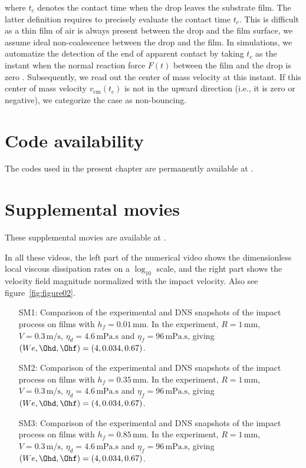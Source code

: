 \begin{subappendices}
	\noindent where $t_c$ denotes the contact time when the drop leaves the substrate film. The latter definition requires to precisely evaluate the contact time $t_c$.
	This is difficult as a thin film of air is always present between the drop and the film surface, we assume ideal non-coalescence between the drop and the film.
	In simulations, we automatize the detection of the end of apparent contact by taking $t_c$ as the instant when the normal reaction force $F(t)$ between the film and the drop is zero \citep[for details on the force calculation, see chapter~\ref{chap:DropForces} and][]{zhang2022impact}. Subsequently, we read out the center of mass velocity at this instant. If this center of mass velocity $v_{\text{cm}}(t_c)$ is not in the upward direction (i.e., it is zero or negative), we categorize the case as non-bouncing. 
	
	\section{Code availability}
	The codes used in the present chapter are permanently available at \citet{basiliskVatsalDropFilm}.
	
	\section{Supplemental movies}
	These supplemental movies are available at \citet[\href{https://youtube.com/playlist?list=PLf5C5HCrvhLHJXLqwpylEwYc2rVtTsCUX}{external YouTube link,}][]{vatsalDropFilmsuppl}. 
	
	In all these videos, the left part of the numerical video shows the dimensionless local viscous dissipation rates on a $\log_{10}$ scale, and the right part shows the velocity field magnitude normalized with the impact velocity. Also see figure~\ref{fig:figure02}.
	
	\begin{enumerate}
		\item[SM1:] Comparison of the experimental and DNS snapshots of the impact process on films with $h_f = 0.01\,\si{\milli\meter}$. In the experiment, $R = 1\,\si{\milli\meter}$, $V = 0.3\,\si{\meter}/\si{\second}$, $\eta_{d} = 4.6\,\si{\milli\pascal}.\si{\second}$ and $\eta_{f} = 96\,\si{\milli\pascal}.\si{\second}$, giving $(We, \Ohd, \Ohf) = (4, 0.034, 0.67)$. 
		\item[SM2:] Comparison of the experimental and DNS snapshots of the impact process on films with $h_f = 0.35\,\si{\milli\meter}$. In the experiment, $R = 1\,\si{\milli\meter}$, $V = 0.3\,\si{\meter}/\si{\second}$, $\eta_{d} = 4.6\,\si{\milli\pascal}.\si{\second}$ and $\eta_{f} = 96\,\si{\milli\pascal}.\si{\second}$, giving $(We, \Ohd, \Ohf) = (4, 0.034, 0.67)$. 
		\item[SM3:]  Comparison of the experimental and DNS snapshots of the impact process on films with $h_f = 0.85\,\si{\milli\meter}$. In the experiment, $R = 1\,\si{\milli\meter}$, $V = 0.3\,\si{\meter}/\si{\second}$, $\eta_{d} = 4.6\,\si{\milli\pascal}.\si{\second}$ and $\eta_{f} = 96\,\si{\milli\pascal}.\si{\second}$, giving $(We, \Ohd, \Ohf) = (4, 0.034, 0.67)$. 
	\end{enumerate}


\end{subappendices}
